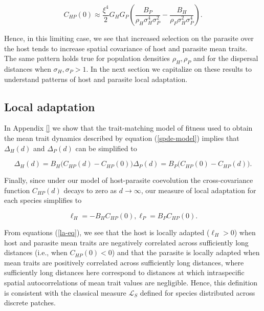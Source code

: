 \documentclass{article}
\begin{document}
\begin{equation}
  C_{HP}(0)\approx \frac{\xi^4}{2}G_HG_P\left(\frac{B_P}{\rho_H\sigma_H^4\sigma_P^2}-\frac{B_H}{\rho_P\sigma_H^2\sigma_P^4}\right).
\end{equation}

Hence, in this limiting case, we see that increased selection on the
parasite over the host tends to increase spatial covariance of host and
parasite mean traits. The same pattern holds true for population
densities \(\rho_H,\rho_P\) and for the dispersal distances when
\(\sigma_H,\sigma_P>1\). In the next section we capitalize on these
results to understand patterns of host and parasite local adaptation.

\hypertarget{local-adaptation}{%
\subsection{Local adaptation}\label{local-adaptation}}

In Appendix \ref{} we show that the trait-matching model of fitness used
to obtain the mean trait dynamics described by equation
(\ref{spde-model}) implies that \(\Delta_H(d)\) and \(\Delta_P(d)\) can
be simplified to

\begin{subequations}
  \begin{equation}
    \Delta_H(d)=B_H\big(C_{HP}(d)-C_{HP}(0)\big)
  \end{equation}
  \begin{equation}
    \Delta_P(d)=B_P\big(C_{HP}(0)-C_{HP}(d)\big).
  \end{equation}
\end{subequations}

Finally, since under our model of host-parasite coevolution the
cross-covariance function \(C_{HP}(d)\) decays to zero as
\(d\to\infty\), our measure of local adaptation for each species
simplifies to

\begin{subequations}\label{la-eq}
  \begin{equation}
    \ell_H = -B_HC_{HP}(0),
  \end{equation}
  \begin{equation}
    \ell_P = B_PC_{HP}(0).
  \end{equation}
\end{subequations}

From equations (\ref{la-eq}), we see that the host is locally adapted
(\(\ell_H>0\)) when host and parasite mean traits are negatively
correlated across sufficiently long distances (i.e., when
\(C_{HP}(0)<0\)) and that the parasite is locally adapted when mean
traits are positively correlated across sufficiently long distances,
where sufficiently long distances here correspond to distances at which
intraspecific spatial autocorrelations of mean trait values are
negligible. Hence, this definition is consistent with the classical
measure \(\mathcal L_S\) defined for species distributed across discrete
patches.
\end{document}
